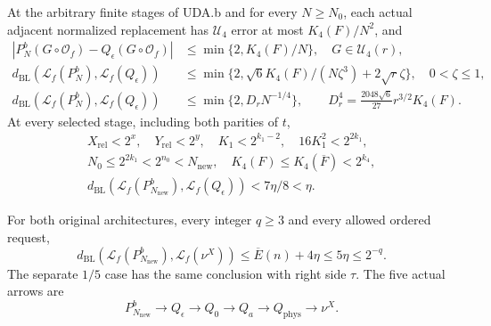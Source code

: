 \begin{theorem}
\label{uda:clause-c}
At the arbitrary finite stages of UDA.b and for every $N\ge N_0$, each
actual adjacent normalized replacement has $\mathcal U_4$ error at most
$K_4(F)/N^2$, and
\begin{align*}
 |P_N^b(G\circ\mathcal O_f)-Q_\epsilon(G\circ\mathcal O_f)|
 &\le\min\{2,K_4(F)/N\},\quad G\in\mathcal U_4(r),\\
 d_{\mathrm{BL}}(\mathcal L_f(P_N^b),\mathcal L_f(Q_\epsilon))
 &\le\min\{2,\sqrt6K_4(F)/(N\zeta^3)+2\sqrt r\zeta\},\quad0<\zeta\le1,\\
 d_{\mathrm{BL}}(\mathcal L_f(P_N^b),\mathcal L_f(Q_\epsilon))
 &\le\min\{2,D_rN^{-1/4}\},\qquad
 D_r^4=\frac{2048\sqrt6}{27}r^{3/2}K_4(F).
\end{align*}
At every selected stage, including both parities of $t$,
\begin{gather*}
 X_{\mathrm{rel}}<2^x,\quad Y_{\mathrm{rel}}<2^y,\quad
 K_1<2^{k_1-2},\quad16K_1^2<2^{2k_1},\\
 N_0\le2^{2k_1}<2^{n_0}<N_{\mathrm{new}},\quad
 K_4(F)\le K_4(\overline F)<2^{k_4},\\
 d_{\mathrm{BL}}(\mathcal L_f(P_{N_{\mathrm{new}}}^b),
                  \mathcal L_f(Q_\epsilon))<7\eta/8<\eta.
\end{gather*}
\end{theorem}

\begin{theorem}
\label{uda:clause-d}
For both original architectures, every integer $q\ge3$ and every allowed
ordered request,
\[
 d_{\mathrm{BL}}(\mathcal L_f(P_{N_{\mathrm{new}}}^b),\mathcal L_f(\nu^X))
 \le\overline E(n)+4\eta\le5\eta\le2^{-q}.
\]
The separate $1/5$ case has the same conclusion with right side $\tau$.
The five actual arrows are
\[
 P_{N_{\mathrm{new}}}^b\longrightarrow Q_\epsilon\longrightarrow Q_0
 \longrightarrow Q_a\longrightarrow Q_{\mathrm{phys}}\longrightarrow\nu^X.
\]
\end{theorem}

